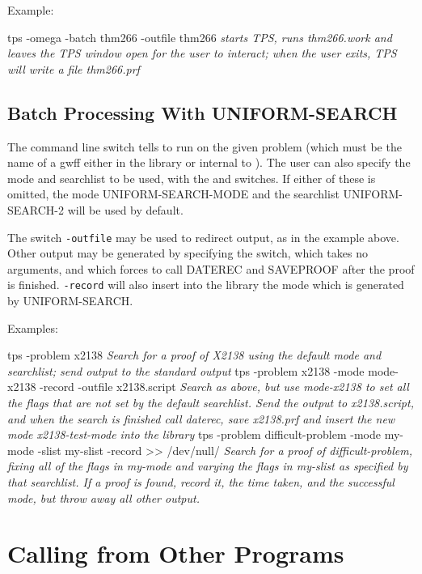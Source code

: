 Example:
\begin{tpsexample}
tps -omega -batch thm266 -outfile thm266
{\it starts TPS, runs thm266.work and leaves the TPS window open for the user to interact;
when the user exits, TPS will write a file thm266.prf}
\end{tpsexample}

\subsection{Batch Processing With UNIFORM-SEARCH}

The command line switch  tells {\TPS} to run  on the given problem (which
must be the name of a gwff either in the library or internal to {\TPS}). The user can also specify the mode and
searchlist to be used, with the  and  switches. If either of these is omitted,
the mode UNIFORM-SEARCH-MODE and the searchlist UNIFORM-SEARCH-2 will be used by default.

The switch {\tt -outfile} may be used to redirect output, as in the example above. Other output may be generated by
specifying the  switch, which takes no arguments, and which forces {\TPS} to call DATEREC and SAVEPROOF
after the proof is finished. {\tt -record} will also insert into the library the mode which is generated by
UNIFORM-SEARCH.

Examples:
\begin{tpsexample}
tps -problem x2138
{\it Search for a proof of X2138 using the default mode and searchlist; send output to the standard output}
tps -problem x2138 -mode mode-x2138 -record -outfile x2138.script
{\it Search as above, but use mode-x2138 to set all the flags that are not set by the default searchlist.
Send the output to x2138.script, and when the search is finished call daterec, save x2138.prf and insert
the new mode x2138-test-mode into the library}
tps -problem difficult-problem -mode my-mode -slist my-slist -record >> /dev/null/
{\it Search for a proof of difficult-problem, fixing all of the flags in my-mode and varying the flags in my-slist
as specified by that searchlist. If a proof is found, record it, the time taken, and the successful mode, but throw
away all other output.}
\end{tpsexample}

\section{Calling {\TPS} from Other Programs}

